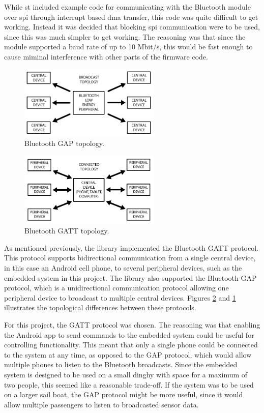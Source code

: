 While \gls{st} included example code for communicating with the Bluetooth module over \gls{spi} through interrupt based \gls{dma} transfer, this code was quite difficult to get working. Instead it was decided that blocking \gls{spi} communication were to be used, since this was much simpler to get working. The reasoning was that since the module supported a baud rate of up to 10 Mbit/s, this would be fast enough to cause miminal interference with other parts of the firmware code.

\begin{figure}[H]
\centering
\includegraphics[width=0.6\textwidth]{Figures/bt_gap.png}
\caption{Bluetooth GAP topology.}
\label{bt-gap}
\end{figure}

\begin{figure}[H]
\centering
\includegraphics[width=0.6\textwidth]{Figures/bt_gatt.png}
\caption{Bluetooth GATT topology.}
\label{bt-gatt}
\end{figure}

As mentioned previously, the library implemented the Bluetooth GATT protocol. This protocol supports bidirectional communication from a single central device, in this case an Android cell phone, to several peripheral devices, such as the embedded system in this project. The library also supported the Bluetooth GAP protocol, which is a unidirectional communication protocol allowing one peripheral device to broadcast to multiple central devices. Figures \ref{bt-gatt} and \ref{bt-gap} illustrates the topological differences between these protocols.

For this project, the GATT protocol was chosen. The reasoning was that enabling the Android app to send commands to the embedded system could be useful for controlling functionality. This meant that only a single phone could be connected to the system at any time, as opposed to the GAP protocol, which would allow multiple phones to listen to the Bluetooth broadcasts. Since the embedded system is designed to be used on a small dinghy with space for a maximum of two people, this seemed like a reasonable trade-off. If the system was to be used on a larger sail boat, the GAP protocol might be more useful, since it would allow multiple passengers to listen to broadcasted sensor data.

